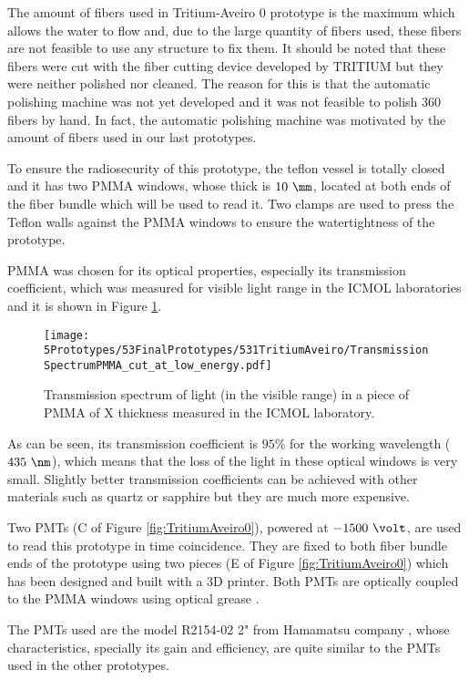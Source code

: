 The amount of fibers used in Tritium-Aveiro 0 prototype is the maximum which allows the water to flow and, due to the large quantity of fibers used, these fibers are not feasible to use any structure to fix them. It should be noted that these fibers were cut with the fiber cutting device developed by TRITIUM but they were neither polished nor cleaned. The reason for this is that the automatic polishing machine was not yet developed and it was not feasible to polish 360 fibers by hand. In fact, the automatic polishing machine was motivated by the amount of fibers used in our last prototypes.

To ensure the radiosecurity of this prototype, the teflon vessel is totally closed and it has two PMMA windows, whose thick is $10~\mm$, located at both ends of the fiber bundle which will be used to read it. Two clamps are used to press the Teflon walls against the PMMA windows to ensure the watertightness of the prototype.

PMMA was chosen for its optical properties, especially its transmission coefficient, which was measured for visible light range in the ICMOL laboratories and it is shown in Figure \ref{fig:PMMATransmissionSpectrum}.

\begin{figure}[h]
\centering
\texttt{[image: 5Prototypes/53FinalPrototypes/531TritiumAveiro/TransmissionSpectrumPMMA\_cut\_at\_low\_energy.pdf]}
\caption{Transmission spectrum of light (in the visible range) in a piece of PMMA of X thickness measured in the ICMOL laboratory. \label{fig:PMMATransmissionSpectrum}}
\end{figure}	

As can be seen, its transmission coefficient is $95\%$ for the working wavelength ($435~\nm$), which means that the loss of the light in these optical windows is very small. Slightly better transmission coefficients can be achieved with other materials such as quartz or sapphire but they are much more expensive.

Two PMTs (C of Figure \ref{fig:TritiumAveiro0}), powered at $-1500~\volt$, are used to read this prototype in time coincidence. They are fixed to both fiber bundle ends of the prototype using two pieces (E of Figure \ref{fig:TritiumAveiro0}) which has been designed and built with a 3D printer. Both PMTs are optically coupled to the PMMA windows using optical grease \cite{OpticalGrease}.

The PMTs used are the model R2154-02 2" from Hamamatsu company \cite{DataSheetPMTsAveiro}, whose characteristics, specially its gain and efficiency, are quite similar to the PMTs used in the other prototypes.


